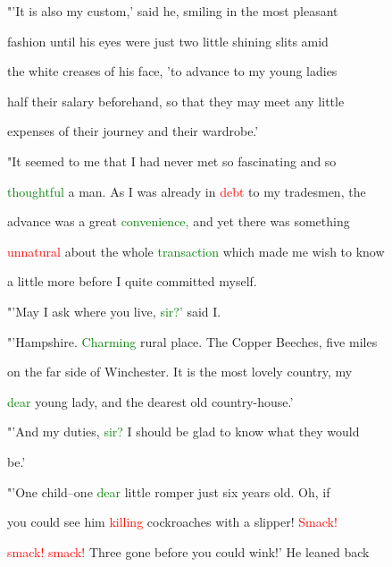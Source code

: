  "'It is also my custom,' said he, \textcolor{BurntOrange}{smiling} in the most \textcolor{BurntOrange}{pleasant}

 fashion until his eyes were just two little shining slits amid

 the \textcolor{BurntOrange}{white} creases of his face, 'to \textcolor{BurntOrange}{advance} to my \textcolor{BurntOrange}{young} ladies

 half their \textcolor{BurntOrange}{salary} beforehand, so that they may meet any little

 expenses of their \textcolor{BurntOrange}{journey} and their wardrobe.'



 "It seemed to me that I had never met so fascinating and so

 \textcolor{green}{thoughtful} a man. As I was already in \textcolor{red}{debt} to my tradesmen, the

 \textcolor{BurntOrange}{advance} was a great \textcolor{green}{convenience,} and yet there was something

 \textcolor{red}{unnatural} about the whole \textcolor{green}{transaction} which made me wish to know

 a little more before I quite committed myself.



 "'May I ask where you live, \textcolor{green}{sir?'} said I.



 "'Hampshire. \textcolor{green}{Charming} rural place. The Copper Beeches, five miles

 on the far side of Winchester. It is the most \textcolor{BurntOrange}{lovely} country, my

 \textcolor{green}{dear} \textcolor{BurntOrange}{young} lady, and the dearest old country-house.'



 "'And my duties, \textcolor{green}{sir?} I should be \textcolor{BurntOrange}{glad} to know what they would

 be.'



 "'One child--one \textcolor{green}{dear} little romper just six years old. Oh, if

 you could see him \textcolor{red}{killing} cockroaches with a slipper! \textcolor{red}{Smack!}

 \textcolor{red}{smack!} \textcolor{red}{smack!} Three gone before you could wink!' He leaned back

